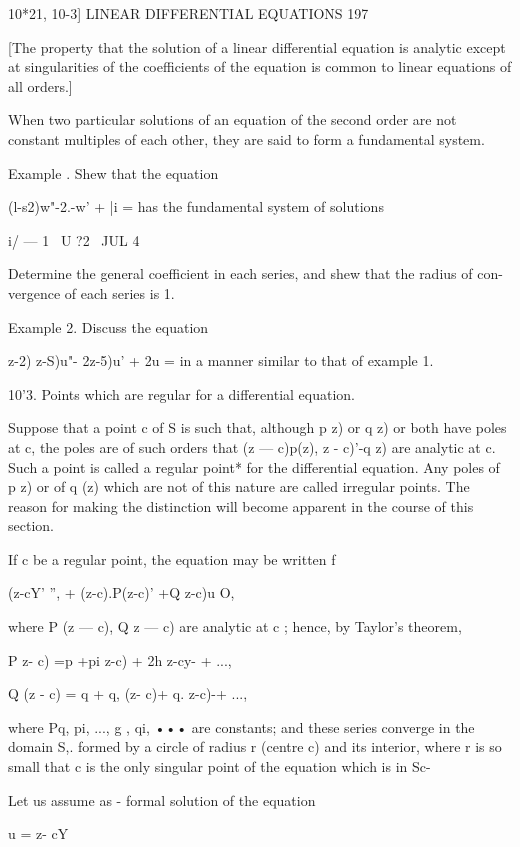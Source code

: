 10*21, 10-3] LINEAR DIFFERENTIAL EQUATIONS 197

[The property that the solution of a linear differential equation is
analytic except at singularities of the coefficients of the equation
is common to linear equations of all orders.]

When two particular solutions of an equation of the second order are
not constant multiples of each other, they are said to form a
fundamental system.

Example . Shew that the equation

(l-s2)w"-2.-w' + |i = has the fundamental system of solutions

i/ — 1 \ U ?2 \ JUL 4 \

Determine the general coefficient in each series, and shew that the
radius of con- vergence of each series is 1.

Example 2. Discuss the equation

 z-2) z-S)u"- 2z-5)u' + 2u = in a manner similar to that of example 1.

10'3. Points which are regular for a differential equation.

Suppose that a point c of S is such that, although p z) or q z) or
both have poles at c, the poles are of such orders that (z — c)p(z), z
- c)'-q z) are analytic at c. Such a point is called a regular point*
for the differential equation. Any poles of p z) or of q (z) which are
not of this nature are called irregular points. The reason for making
the distinction will become apparent in the course of this section.

If c be a regular point, the equation may be written f

(z-cY' '', + (z-c).P(z-c)' +Q z-c)u O,

where P (z — c), Q z — c) are analytic at c ; hence, by Taylor's
theorem,

P z- c) =p +pi z-c) + 2h z-cy- + ...,

Q (z - c) = q + q, (z- c)+ q. z-c)-+ ...,

where Pq, pi, ..., g , qi, ••• are constants; and these series
converge in the domain S,. formed by a circle of radius r (centre c)
and its interior, where r is so small that c is the only singular
point of the equation which is in Sc-

Let us assume as - formal solution of the equation



u = z- cY




